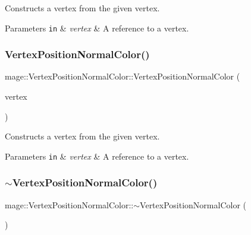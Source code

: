 Constructs a vertex from the given vertex.


\begin{DoxyParams}[1]{Parameters}
\mbox{\tt in}  & {\em vertex} & A reference to a vertex. \\
\hline
\end{DoxyParams}
\hypertarget{structmage_1_1_vertex_position_normal_color_aa2576c4e552f638bab84a715d1b53ea3}{}\label{structmage_1_1_vertex_position_normal_color_aa2576c4e552f638bab84a715d1b53ea3} 
\subsubsection{\texorpdfstring{Vertex\+Position\+Normal\+Color()}{VertexPositionNormalColor()}\hspace{0.1cm}{\footnotesize\ttfamily [4/4]}}
{\footnotesize\ttfamily mage\+::\+Vertex\+Position\+Normal\+Color\+::\+Vertex\+Position\+Normal\+Color (\begin{DoxyParamCaption}\item[{\hyperlink{structmage_1_1_vertex_position_normal_color}{Vertex\+Position\+Normal\+Color} \&\&}]{vertex }\end{DoxyParamCaption})\hspace{0.3cm}{\ttfamily [default]}}

Constructs a vertex from the given vertex.


\begin{DoxyParams}[1]{Parameters}
\mbox{\tt in}  & {\em vertex} & A reference to a vertex. \\
\hline
\end{DoxyParams}
\hypertarget{structmage_1_1_vertex_position_normal_color_a4c51d0599843601d1cc1a6a55149aafe}{}\label{structmage_1_1_vertex_position_normal_color_a4c51d0599843601d1cc1a6a55149aafe} 
\subsubsection{\texorpdfstring{$\sim$\+Vertex\+Position\+Normal\+Color()}{~VertexPositionNormalColor()}}
{\footnotesize\ttfamily mage\+::\+Vertex\+Position\+Normal\+Color\+::$\sim$\+Vertex\+Position\+Normal\+Color (\begin{DoxyParamCaption}{ }\end{DoxyParamCaption})\hspace{0.3cm}{\ttfamily [default]}}

